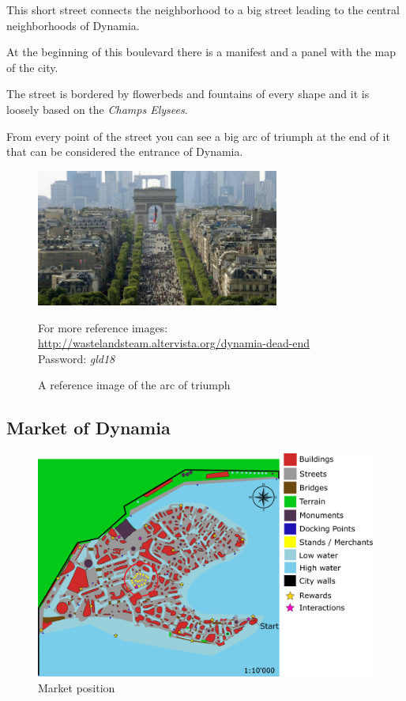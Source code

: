This short street connects the neighborhood to a big street leading to the central neighborhoods of Dynamia.

At the beginning of this boulevard there is a manifest and a panel with the map of the city.

The street is bordered by flowerbeds and fountains of every shape and it is loosely based on the \textit{Champs Elysees}.

From every point of the street you can see a big arc of triumph at the end of it that can be considered the entrance of Dynamia.

\begin{figure}[H]
    \centering
    \includegraphics[width=8cm]{Images/Landmarks/arcOfTriumph}
    \caption{A reference image of the arc of triumph}
    For more reference images: \href{http://wastelandsteam.altervista.org/dynamia-dead-end}{http://wastelandsteam.altervista.org/dynamia-dead-end}\\Password: \textit{gld18}
  \end{figure}

\subsection{Market of Dynamia}
\begin{figure}[H]
  \centering
  \includegraphics[width=12cm]{Images/Maps/dynamia_market}
  \caption{Market position}
\end{figure}

